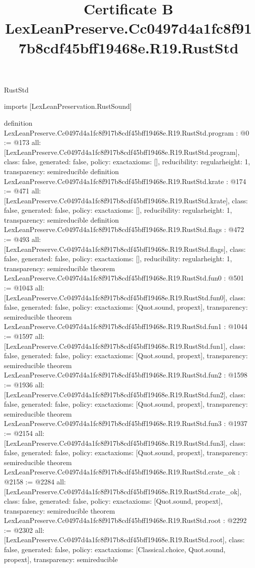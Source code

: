 \begin{lexlean}{RustStd}
\title{Certificate B LexLeanPreserve.Cc0497d4a1fc8f917b8cdf45bff19468e.R19.RustStd}
\begin{coremodule}
imports [LexLeanPreservation.RustSound]

definition LexLeanPreserve.Cc0497d4a1fc8f917b8cdf45bff19468e.R19.RustStd.program : @0 := @173 {
  all: [LexLeanPreserve.Cc0497d4a1fc8f917b8cdf45bff19468e.R19.RustStd.program],
  class: false,
  generated: false,
  policy: exact{axioms: []},
  reducibility: regular{height: 1},
  transparency: semireducible
}
definition LexLeanPreserve.Cc0497d4a1fc8f917b8cdf45bff19468e.R19.RustStd.krate : @174 := @471 {
  all: [LexLeanPreserve.Cc0497d4a1fc8f917b8cdf45bff19468e.R19.RustStd.krate],
  class: false,
  generated: false,
  policy: exact{axioms: []},
  reducibility: regular{height: 1},
  transparency: semireducible
}
definition LexLeanPreserve.Cc0497d4a1fc8f917b8cdf45bff19468e.R19.RustStd.flags : @472 := @493 {
  all: [LexLeanPreserve.Cc0497d4a1fc8f917b8cdf45bff19468e.R19.RustStd.flags],
  class: false,
  generated: false,
  policy: exact{axioms: []},
  reducibility: regular{height: 1},
  transparency: semireducible
}
theorem LexLeanPreserve.Cc0497d4a1fc8f917b8cdf45bff19468e.R19.RustStd.fun0 : @501 := @1043 {
  all: [LexLeanPreserve.Cc0497d4a1fc8f917b8cdf45bff19468e.R19.RustStd.fun0],
  class: false,
  generated: false,
  policy: exact{axioms: [Quot.sound, propext]},
  transparency: semireducible
}
theorem LexLeanPreserve.Cc0497d4a1fc8f917b8cdf45bff19468e.R19.RustStd.fun1 : @1044 := @1597 {
  all: [LexLeanPreserve.Cc0497d4a1fc8f917b8cdf45bff19468e.R19.RustStd.fun1],
  class: false,
  generated: false,
  policy: exact{axioms: [Quot.sound, propext]},
  transparency: semireducible
}
theorem LexLeanPreserve.Cc0497d4a1fc8f917b8cdf45bff19468e.R19.RustStd.fun2 : @1598 := @1936 {
  all: [LexLeanPreserve.Cc0497d4a1fc8f917b8cdf45bff19468e.R19.RustStd.fun2],
  class: false,
  generated: false,
  policy: exact{axioms: [Quot.sound, propext]},
  transparency: semireducible
}
theorem LexLeanPreserve.Cc0497d4a1fc8f917b8cdf45bff19468e.R19.RustStd.fun3 : @1937 := @2154 {
  all: [LexLeanPreserve.Cc0497d4a1fc8f917b8cdf45bff19468e.R19.RustStd.fun3],
  class: false,
  generated: false,
  policy: exact{axioms: [Quot.sound, propext]},
  transparency: semireducible
}
theorem LexLeanPreserve.Cc0497d4a1fc8f917b8cdf45bff19468e.R19.RustStd.crate_ok : @2158 := @2284 {
  all: [LexLeanPreserve.Cc0497d4a1fc8f917b8cdf45bff19468e.R19.RustStd.crate_ok],
  class: false,
  generated: false,
  policy: exact{axioms: [Quot.sound, propext]},
  transparency: semireducible
}
theorem LexLeanPreserve.Cc0497d4a1fc8f917b8cdf45bff19468e.R19.RustStd.root : @2292 := @2302 {
  all: [LexLeanPreserve.Cc0497d4a1fc8f917b8cdf45bff19468e.R19.RustStd.root],
  class: false,
  generated: false,
  policy: exact{axioms: [Classical.choice, Quot.sound, propext]},
  transparency: semireducible
}


\end{coremodule}
\end{lexlean}
